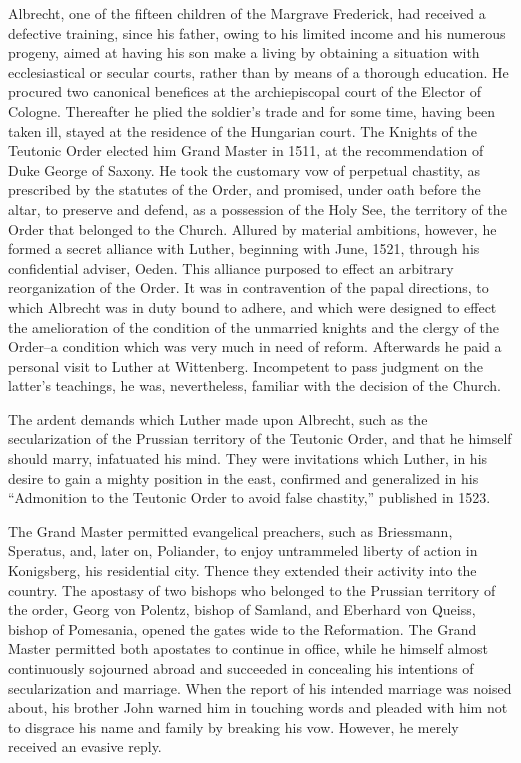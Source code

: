 Albrecht, one of the fifteen children of the Margrave Frederick,
had received a defective training, since his father, owing to his limited
income and his numerous progeny, aimed at having his son make
a living by obtaining a situation with ecclesiastical or secular courts,
rather than by means of a thorough education. He procured two canonical
benefices at the archiepiscopal court of the Elector of Cologne.
Thereafter he plied the soldier’s trade and for some time, having been
taken ill, stayed at the residence of the Hungarian court. The
Knights of the Teutonic Order elected him Grand Master in 1511, at
the recommendation of Duke George of Saxony. He took the customary
vow of perpetual chastity, as prescribed by the statutes of the
Order, and promised, under oath before the altar, to preserve and
defend, as a possession of the Holy See, the territory of the Order
that belonged to the Church. Allured by material ambitions, however,
he formed a secret alliance with Luther, beginning with June,
1521, through his confidential adviser, Oeden. This alliance purposed
to effect an arbitrary reorganization of the Order. It was in
contravention of the papal directions, to which Albrecht was in duty
bound to adhere, and which were designed to effect the amelioration of
the condition of the unmarried knights and the clergy of the
Order--a condition which was very much in need of reform. Afterwards he
paid a personal visit to Luther at Wittenberg. Incompetent
to pass judgment on the latter’s teachings, he was, nevertheless,
familiar with the decision of the Church.

The ardent demands which Luther made upon Albrecht, such as
the secularization of the Prussian territory of the Teutonic Order,
and that he himself should marry, infatuated his mind. They were
invitations which Luther, in his desire to gain a mighty position in
the east, confirmed and generalized in his “Admonition to the Teutonic
Order to avoid false chastity,” published in 1523.

The Grand Master permitted evangelical preachers, such as Briessmann,
Speratus, and, later on, Poliander, to enjoy untrammeled liberty
of action in Konigsberg, his residential city. Thence they extended their
activity into the country. The apostasy of two bishops
who belonged to the Prussian territory of the order, Georg von
Polentz, bishop of Samland, and Eberhard von Queiss, bishop of
Pomesania, opened the gates wide to the Reformation. The Grand
Master permitted both apostates to continue in office, while he himself
almost continuously sojourned abroad and succeeded in concealing
his intentions of secularization and marriage. When the report of his
intended marriage was noised about, his brother John warned him
in touching words and pleaded with him not to disgrace his name
and family by breaking his vow. However, he merely received an
evasive reply.

